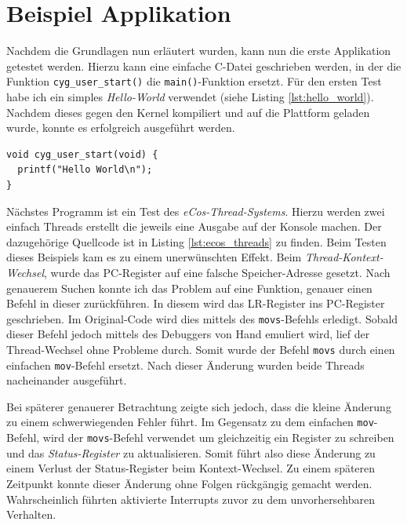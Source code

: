 \documentclass[
  a4paper,					%
  twoside,
  DIV=calc,     				%
  bibliography=totoc,
  cleardoublepage=empty,
  ngerman,     					%
  final       					%
]{scrbook}
\begin{document}
\section{Beispiel Applikation}
\label{sec:BeispielApp}
Nachdem die Grundlagen nun erläutert wurden, kann nun die erste Applikation getestet werden. Hierzu kann eine einfache C-Datei geschrieben werden, in der die Funktion \texttt{cyg\_user\_start()} die \texttt{main()}-Funktion ersetzt. Für den ersten Test habe ich ein simples \emph{Hello-World} verwendet (siehe Listing \ref{lst:hello_world}). Nachdem dieses gegen den Kernel kompiliert und auf die Plattform geladen wurde, konnte es erfolgreich ausgeführt werden.

\begin{lstlisting}[frame=single, float, caption={Hello World}, label={lst:hello_world}]
void cyg_user_start(void) {
  printf("Hello World\n");
}
\end{lstlisting}

Nächstes Programm ist ein Test des \emph{eCos-Thread-Systems}. Hierzu werden zwei einfach Threads erstellt die jeweils eine Ausgabe auf der Konsole machen. Der dazugehörige Quellcode ist in Listing \ref{lst:ecos_threads} zu finden. Beim Testen dieses Beispiels kam es zu einem unerwünschten Effekt. Beim \emph{Thread-Kontext-Wechsel}, wurde das PC-Register auf eine falsche Speicher-Adresse gesetzt. Nach genauerem Suchen konnte ich das Problem auf eine Funktion, genauer einen Befehl in dieser zurückführen. In diesem wird das LR-Register ins PC-Register geschrieben. Im Original-Code wird dies mittels des \texttt{movs}-Befehls erledigt. Sobald dieser Befehl jedoch mittels des Debuggers von Hand emuliert wird, lief der Thread-Wechsel ohne Probleme durch. Somit wurde der Befehl \texttt{movs} durch einen einfachen \texttt{mov}-Befehl ersetzt. Nach dieser Änderung wurden beide Threads nacheinander ausgeführt. 

Bei späterer genauerer Betrachtung zeigte sich jedoch, dass die kleine Änderung zu einem schwerwiegenden Fehler führt. Im Gegensatz zu dem einfachen \texttt{mov}-Befehl, wird der \texttt{movs}-Befehl verwendet um gleichzeitig ein Register zu schreiben und das \emph{Status-Register} zu aktualisieren. Somit führt also diese Änderung zu einem Verlust der Status-Register beim Kontext-Wechsel. Zu einem späteren Zeitpunkt konnte dieser Änderung ohne Folgen rückgängig gemacht werden. Wahrscheinlich führten aktivierte Interrupts zuvor zu dem unvorhersehbaren Verhalten.
\end{document}

